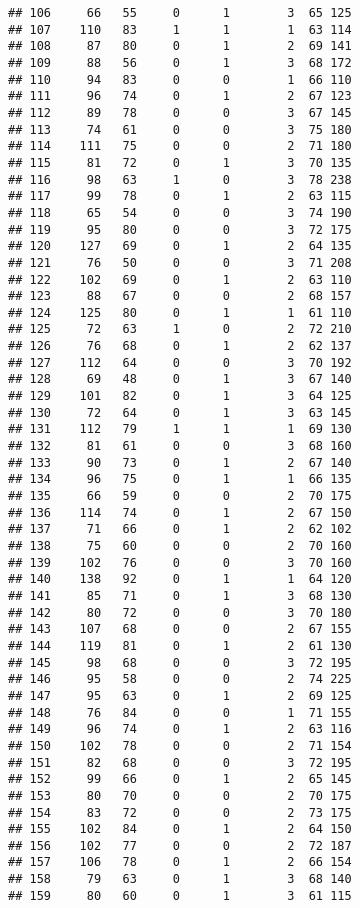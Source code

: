 \documentclass[
]{article}
\begin{document}
\begin{verbatim}
## 106     66   55     0      1        3  65 125
## 107    110   83     1      1        1  63 114
## 108     87   80     0      1        2  69 141
## 109     88   56     0      1        3  68 172
## 110     94   83     0      0        1  66 110
## 111     96   74     0      1        2  67 123
## 112     89   78     0      0        3  67 145
## 113     74   61     0      0        3  75 180
## 114    111   75     0      0        2  71 180
## 115     81   72     0      1        3  70 135
## 116     98   63     1      0        3  78 238
## 117     99   78     0      1        2  63 115
## 118     65   54     0      0        3  74 190
## 119     95   80     0      0        3  72 175
## 120    127   69     0      1        2  64 135
## 121     76   50     0      0        3  71 208
## 122    102   69     0      1        2  63 110
## 123     88   67     0      0        2  68 157
## 124    125   80     0      1        1  61 110
## 125     72   63     1      0        2  72 210
## 126     76   68     0      1        2  62 137
## 127    112   64     0      0        3  70 192
## 128     69   48     0      1        3  67 140
## 129    101   82     0      1        3  64 125
## 130     72   64     0      1        3  63 145
## 131    112   79     1      1        1  69 130
## 132     81   61     0      0        3  68 160
## 133     90   73     0      1        2  67 140
## 134     96   75     0      1        1  66 135
## 135     66   59     0      0        2  70 175
## 136    114   74     0      1        2  67 150
## 137     71   66     0      1        2  62 102
## 138     75   60     0      0        2  70 160
## 139    102   76     0      0        3  70 160
## 140    138   92     0      1        1  64 120
## 141     85   71     0      1        3  68 130
## 142     80   72     0      0        3  70 180
## 143    107   68     0      0        2  67 155
## 144    119   81     0      1        2  61 130
## 145     98   68     0      0        3  72 195
## 146     95   58     0      0        2  74 225
## 147     95   63     0      1        2  69 125
## 148     76   84     0      0        1  71 155
## 149     96   74     0      1        2  63 116
## 150    102   78     0      0        2  71 154
## 151     82   68     0      0        3  72 195
## 152     99   66     0      1        2  65 145
## 153     80   70     0      0        2  70 175
## 154     83   72     0      0        2  73 175
## 155    102   84     0      1        2  64 150
## 156    102   77     0      0        2  72 187
## 157    106   78     0      1        2  66 154
## 158     79   63     0      1        3  68 140
## 159     80   60     0      1        3  61 115

\end{verbatim}
\end{document}
